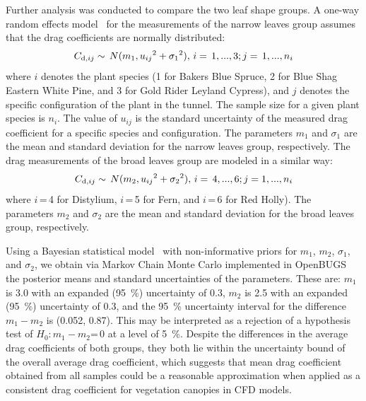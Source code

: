 \documentclass[12pt]{article}
\begin{document}
Further analysis was conducted to compare the two leaf shape groups. A one-way random effects model~\cite{Toman2009} for the measurements of the narrow leaves group assumes that the drag coefficients are normally distributed:
\begin{equation}
\label{eq:NarrowLeavesDragCoefficient}
C_{{\rm d},ij}\sim\,N(m_{1},{u_{ij}}^2+{\sigma_1}^2),\, i=\, 1,...,3; j=\, 1,...,n_{i}
\end{equation}
where $i$ denotes the plant species (1 for Bakers Blue Spruce, 2 for Blue Shag Eastern White Pine, and 3 for Gold Rider Leyland Cypress), and $j$ denotes the specific configuration of the plant in the tunnel. The sample size for a given plant species is $n_{i}$. The value of $u_{ij}$ is the standard uncertainty of the measured drag coefficient for a specific species and configuration. The parameters $m_{1}$ and $\sigma_1$ are the mean and standard deviation for the narrow leaves group, respectively. The drag measurements of the broad leaves group are modeled in a similar way:
\begin{equation}
\label{eq:BroadLeavesDragCoefficient}
C_{{\rm d},ij}\sim\,N(m_{2},{u_{ij}}^2+{\sigma_2}^2),\, i=\, 4,...,6; j = 1,...,n_{i}
\end{equation}
where $i$\,=\,4 for Distylium, $i$\,=\,5 for Fern, and $i$\,=\,6 for Red Holly). The parameters $m_2$ and $\sigma_2$ are the mean and standard deviation for the broad leaves group, respectively.

Using a Bayesian statistical model~\cite{Gelman2008} with non-informative priors for $m_{1}$, $m_{2}$, $\sigma_1$, and $\sigma_2$, we obtain via Markov Chain Monte Carlo implemented in OpenBUGS~\cite{Lunn2009} the posterior means and standard uncertainties of the parameters. These are: $m_{1}$ is 3.0 with an expanded (95~\%) uncertainty of 0.3, $m_{2}$ is 2.5 with an expanded (95~\%) uncertainty of 0.3, and the 95~\% uncertainty interval for the difference $m_{1}-m_{2}$ is (0.052, 0.87). This may be interpreted as a rejection of a hypothesis test of $H_{0}$:\,$m_{1}-m_{2}$=\,0 at a level of 5~\%. Despite the differences in the average drag coefficients of both groups, they both lie within the uncertainty bound of the overall average drag coefficient, which suggests that mean drag coefficient obtained from all samples could be a reasonable approximation when applied as a consistent drag coefficient for vegetation canopies in CFD models.
\end{document}
